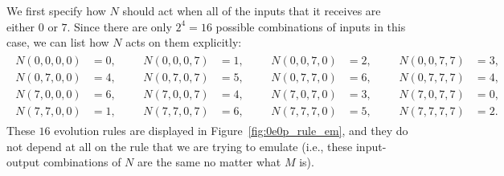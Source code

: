 We first specify how $N$ should act when all of the inputs that it receives are either $0$ or $7$. Since there are only $2^4 = 16$ possible combinations of inputs in this case, we can list how $N$ acts on them explicitly:
\begin{align}\label{eq:0e0p_N_from_even}
	\begin{aligned}
		N(0,0,0,0) & = 0, \\ N(0,7,0,0) & = 4, \\ N(7,0,0,0) & = 6, \\ N(7,7,0,0) & = 1,
	\end{aligned} && \begin{aligned}
		N(0,0,0,7) & = 1, \\ N(0,7,0,7) & = 5, \\ N(7,0,0,7) & = 4, \\ N(7,7,0,7) & = 6,
	\end{aligned} && \begin{aligned}
		N(0,0,7,0) & = 2, \\ N(0,7,7,0) & = 6, \\ N(7,0,7,0) & = 3, \\ N(7,7,7,0) & = 5,
	\end{aligned} && \begin{aligned}
		N(0,0,7,7) & = 3, \\ N(0,7,7,7) & = 4, \\ N(7,0,7,7) & = 0, \\ N(7,7,7,7) & = 2.
	\end{aligned}
\end{align}
These $16$ evolution rules are displayed in Figure~\ref{fig:0e0p_rule_em}, and they do not depend at all on the rule that we are trying to emulate (i.e., these input-output combinations of $N$ are the same no matter what $M$ is).

